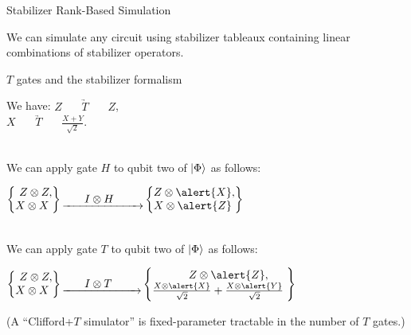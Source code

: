 \begin{frame}{Stabilizer Rank-Based Simulation}

\begin{refsection}



\begin{definition}
	We can simulate any circuit using stabilizer tableaux containing linear combinations of stabilizer operators.
\end{definition}

%
%

\begin{exampleblock}{$T$ gates and the stabilizer formalism}

We have:
\tab $Z~~~ \underrightarrow{~~~~~T~~~~~} ~~~Z$,\\ \vspace{.9em}
\tab $X~~~ \underrightarrow{~~~~~T~~~~~} ~~~\frac{X+Y}{\sqrt 2}$.

\pause

~\\

We can apply gate $H $ to qubit two of $\ket{\Phi}$ as follows:
\vspace{.5em}

\begin{center}
$\left\{\amat{Z\otimes Z,\\ X\otimes X\phantom,}\right\} \underrightarrow{~~~~~~I \otimes H~~~~~~~~}
\left\{\amat{Z\otimes \alert{X},\\ X\otimes \alert{Z}\phantom,}\right\} 
$
\end{center}

~\\


We can apply gate $T$ to qubit two of $\ket{\Phi}$ as follows:
\vspace{.5em}

\centering
$\left\{\amat{Z\otimes Z,\\ X\otimes X\phantom,}\right\} \underrightarrow{~~~~~~I \otimes T~~~~~~~~}
\left\{\amat{  Z\otimes \alert{Z},~~~~~\\ 
		 \frac{X\otimes \alert{X}}{\sqrt 2} +  \frac{X\otimes \alert{Y}}{\sqrt 2} \phantom,}\right\} 
$


\end{exampleblock}
\end{refsection}

\pause
\alert{(A ``Clifford+$T$ simulator'' is fixed-parameter tractable in the number of $T$ gates.)}

\end{frame}





